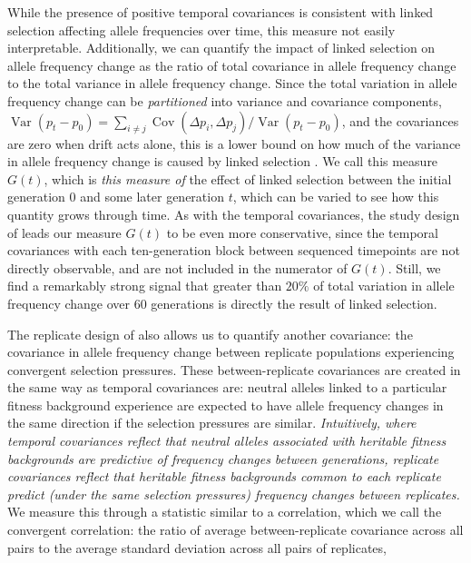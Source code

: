 \documentclass[11pt]{article}
\newcommand{\vb}[1]{{\it \color{blue} #1}}
\DeclareMathOperator{\var}{Var}
\DeclareMathOperator{\cov}{Cov}
\begin{document}
While the presence of positive temporal covariances is consistent with linked
selection affecting allele frequencies over time, this measure not easily
interpretable. Additionally, we can quantify the impact of linked selection on
allele frequency change as the ratio of total covariance in allele frequency
change to the total variance in allele frequency change. Since the total
variation in allele frequency change can be \vb{partitioned} into variance and
covariance components, $\var(p_t - p_0) = \sum_{i \ne j} \cov(\Delta p_i,
\Delta p_j) / \var(p_t - p_0)$, and the covariances are zero when drift acts
alone, this is a lower bound on how much of the variance in allele frequency
change is caused by linked selection \parencite{Buffalo2019-io}. We call this
measure $G(t)$, which is \vb{this measure of} the effect of linked selection
between the initial generation $0$ and some later generation $t$, which can be
varied to see how this quantity grows through time. As with the temporal
covariances, the study design of \textcite{Barghi2019-qy} leads our measure
$G(t)$ to be even more conservative, since the temporal covariances with each
ten-generation block between sequenced timepoints are not directly observable,
and are not included in the numerator of $G(t)$. Still, we find a remarkably
strong signal that greater than $20\%$ of total variation in allele frequency
change over 60 generations is directly the result of linked selection.

The replicate design of \textcite{Barghi2019-qy} also allows us to quantify
another covariance: the covariance in allele frequency change between replicate
populations experiencing convergent selection pressures. These
between-replicate covariances are created in the same way as temporal
covariances are: neutral alleles linked to a particular fitness background
experience are expected to have allele frequency changes in the same direction
if the selection pressures are similar. \vb{Intuitively, where temporal
  covariances reflect that neutral alleles associated with heritable fitness
  backgrounds are predictive of frequency changes between generations,
  replicate covariances reflect that heritable fitness backgrounds common to
each replicate predict (under the same selection pressures) frequency changes
between replicates.} We measure this through a statistic similar to a
correlation, which we call the convergent correlation: the ratio of average
between-replicate covariance across all pairs to the average standard deviation
across all pairs of replicates, 
\end{document}
